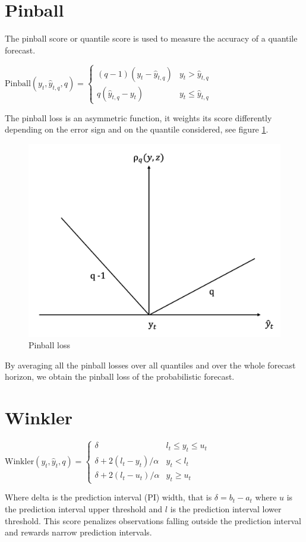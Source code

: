 \section{Pinball}\label{pinball}
The pinball score or quantile score is used to measure the accuracy of a quantile forecast.
\begin{definition}
    $\mathrm{Pinball}(y_{t},\hat{y}_{t,q},q)=
\begin{cases}
(q-1)(y_{t}-\hat{y}_{t,q}) & y_t > \hat{y}_{t,q} \\
q(\hat{y}_{t,q}-y_t) & y_t \leq \hat{y}_{t,q}
\end{cases}$
\end{definition}
The pinball loss is an asymmetric function, it weights its score differently depending on the error sign and on the quantile considered, see figure \ref{fig:pinball}.
\begin{figure}
    \includegraphics[width=\textwidth]{images/pinball_loss.png}
    \caption{Pinball loss}
    \label{fig:pinball}
  \end{figure}
By averaging all the pinball losses over all quantiles and over the whole forecast horizon, we obtain the pinball loss of the probabilistic forecast.
\section{Winkler}
\begin{definition}
    $\mathrm{Winkler}(y_t, \hat{y}_t,q)=\begin{cases}
        \delta & l_{t}\leq y_{t}\leq u_{t}\\
        \delta+2(l_{t}-y_{t})/\alpha & y_{t}< l_{t}\\
        \delta+2(l_{t}-u_{t})/\alpha & y_{t} \geq u_{t}
    \end{cases}$
\end{definition}
Where delta is the prediction interval (PI) width, that is $\delta=b_t-a_t$ where $u$ is the prediction interval upper threshold and $l$ is the prediction interval lower threshold. This score penalizes observations falling outside the prediction interval and rewards narrow prediction intervals.
